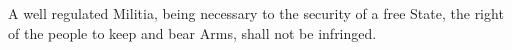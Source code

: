 
\par A well regulated Militia, being necessary to the security of a free State, the right of the people to keep and bear Arms, shall not be infringed. 